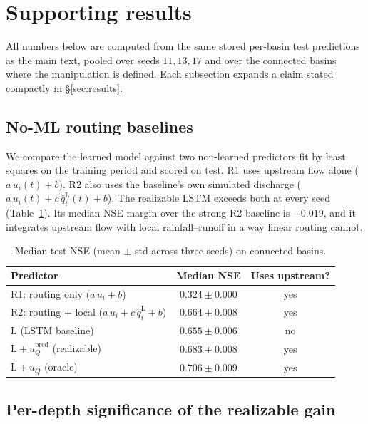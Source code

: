 \documentclass[11pt]{article}
\begin{document}
\appendix
\section{Supporting results}
\label{app:support}

All numbers below are computed from the same stored per-basin test predictions as the main text,
pooled over seeds $11,13,17$ and over the connected basins where the manipulation is defined. Each
subsection expands a claim stated compactly in \S\ref{sec:results}.

\subsection{No-ML routing baselines}
\label{app:routing}

We compare the learned model against two non-learned predictors fit by least squares on the training
period and scored on test. R1 uses upstream flow alone ($a\,u_i(t)+b$). R2 also uses the baseline's
own simulated discharge ($a\,u_i(t)+c\,\hat q^{\mathrm{L}}_i(t)+b$). The realizable LSTM exceeds both
at every seed (Table~\ref{tab:routing}). Its median-NSE margin over the strong R2 baseline is
$+0.019$, and it integrates upstream flow with local rainfall--runoff in a way linear routing cannot.

\begin{table}[h]
\centering
\caption{Median test NSE (mean $\pm$ std across three seeds) on connected basins.}
\label{tab:routing}
\begin{tabular}{lcc}
\toprule
Predictor & Median NSE & Uses upstream? \\
\midrule
R1: routing only ($a\,u_i+b$) & $0.324\pm0.000$ & yes \\
R2: routing $+$ local ($a\,u_i+c\,\hat q^{\mathrm{L}}_i+b$) & $0.664\pm0.008$ & yes \\
$\mathrm{L}$ (LSTM baseline) & $0.655\pm0.006$ & no \\
$\mathrm{L}{+}u_Q^{\mathrm{pred}}$ (realizable) & $0.683\pm0.008$ & yes \\
$\mathrm{L}{+}u_Q$ (oracle) & $0.706\pm0.009$ & yes \\
\bottomrule
\end{tabular}
\end{table}

\subsection{Per-depth significance of the realizable gain}
\label{app:depth}
\end{document}
